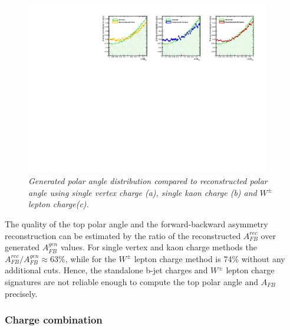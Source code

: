 \begin{figure}[h]
	{\centering
		\includegraphics[width=0.95\textwidth]{ILD/plots/one-charge.pdf}
		\caption{\sl Generated polar angle distribution compared to reconstructed polar angle using single vertex charge (a), single kaon charge (b) and $W^\pm$ lepton charge(c).
		}
		\label{fig:OneCharge_3}
	}
	
\end{figure}

The quality of the top polar angle and the forward-backward asymmetry reconstruction can be estimated by the ratio of the reconstructed $A_{FB}^{rec}$ over generated $A^{gen}_{FB}$ values.
For single vertex and kaon charge methods the $A_{FB}^{rec}/A^{gen}_{FB} \approx 63\%$, while for the $W^\pm$ lepton charge method is 74\% without any additional cuts. 
Hence, the standalone b-jet charges and $W^\pm$ lepton charge signatures are not reliable enough to compute the top polar angle and $A_{FB}$ precisely. 
\subsubsection{Charge combination}

